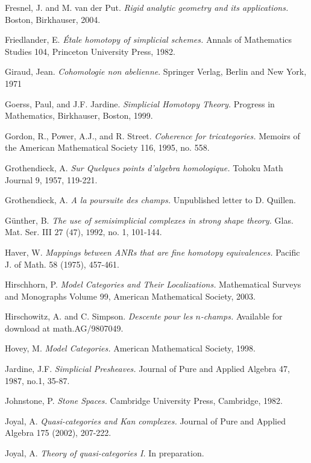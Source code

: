 \documentclass{report}[10pt, final]
\theoremstyle{definition}
\begin{document}
\begin{thebibliography}{99}
 Fresnel, J. and M. van der Put. {\it Rigid analytic geometry and its applications.} Boston, Birkhauser, 2004. 

 Friedlander, E. {\it \'{E}tale homotopy of simplicial schemes.} Annals of Mathematics Studies  104, Princeton University Press, 1982.

 Giraud, Jean. {\it Cohomologie non abelienne}.
Springer Verlag, Berlin and New York, 1971

 Goerss, Paul, and J.F. Jardine. {\it Simplicial Homotopy Theory.} Progress in Mathematics, Birkhauser, Boston, 1999.

 Gordon, R., Power, A.J., and R. Street.
{\it Coherence for tricategories.} Memoirs of the American
Mathematical Society 116, 1995, no. 558.

 Grothendieck, A. {\it Sur Quelques points
d'algebra homologique.} Tohoku Math Journal 9, 1957, 119-221.

 Grothendieck, A. {\it A la poursuite des champs.} Unpublished letter to
D. Quillen.

 G\"{u}nther, B. {\it The use of semisimplicial
complexes in strong shape theory.} Glas. Mat. Ser. III $27$ ($47$), $1992$, no. 1, 101-144.

 Haver, W. {\it Mappings between ANRs that are fine homotopy equivalences.} Pacific J. of Math. 58 (1975), 457-461.

 Hirschhorn, P. {\it Model Categories and Their Localizations.} Mathematical Surveys and Monographs Volume 99, American Mathematical Society, 2003. 

 Hirschowitz, A. and C. Simpson. {\it Descente pour les $n$-champs.} Available for download at math.AG/9807049.

 Hovey, M. {\it Model Categories.} American Mathematical Society, 1998.

 Jardine, J.F. {\it Simplicial Presheaves.} Journal
of Pure and Applied Algebra 47, 1987, no.1, 35-87.

 Johnstone, P. {\it Stone Spaces.}
Cambridge University Press, Cambridge, 1982.

 Joyal, A. {\it Quasi-categories and Kan
complexes.} Journal of Pure and Applied Algebra 175 (2002),
207-222.

 Joyal, A. {\it Theory of quasi-categories I.} In preparation.


\end{thebibliography}
\end{document}
